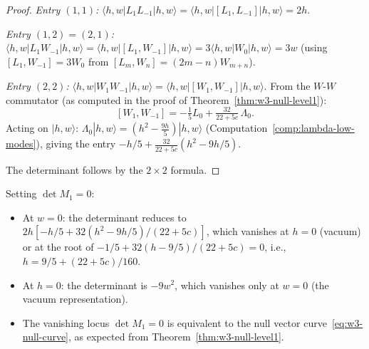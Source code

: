\begin{proof}
\emph{Entry $(1,1)$:}
$\langle h,w|L_1 L_{-1}|h,w\rangle = \langle h,w|[L_1,L_{-1}]|h,w\rangle
= 2h$.

\emph{Entry $(1,2) = (2,1)$:}
$\langle h,w|L_1 W_{-1}|h,w\rangle = \langle h,w|[L_1,W_{-1}]|h,w\rangle
= 3\langle h,w|W_0|h,w\rangle = 3w$
(using $[L_1, W_{-1}] = 3W_0$ from $[L_m, W_n] = (2m{-}n)W_{m+n}$).

\emph{Entry $(2,2)$:}
$\langle h,w|W_1 W_{-1}|h,w\rangle = \langle h,w|[W_1,W_{-1}]|h,w\rangle$.
From the $W$-$W$ commutator (as computed in the proof of
Theorem~\ref{thm:w3-null-level1}):
\[
[W_1, W_{-1}] = -\tfrac{1}{5}L_0 + \tfrac{32}{22+5c}\,\Lambda_0.
\]
Acting on $|h,w\rangle$: $\Lambda_0|h,w\rangle = (h^2 - \frac{9h}{5})|h,w\rangle$
(Computation~\ref{comp:lambda-low-modes}), giving the entry
$-h/5 + \frac{32}{22+5c}(h^2 - 9h/5)$.

The determinant follows by the $2\times 2$ formula.
\end{proof}

\begin{computation}\label{comp:kac-vanishing-level1}
Setting $\det M_1 = 0$:
\begin{itemize}
\item At $w = 0$: the determinant reduces to
  $2h[-h/5 + 32(h^2 - 9h/5)/(22+5c)]$, which vanishes at
  $h = 0$ (vacuum) or at the root of
  $-1/5 + 32(h - 9/5)/(22+5c) = 0$, i.e.,
  $h = 9/5 + (22+5c)/160$.
\item At $h = 0$: the determinant is $-9w^2$, which vanishes
  only at $w = 0$ (the vacuum representation).
\item The vanishing locus $\det M_1 = 0$ is equivalent to
  the null vector curve~\eqref{eq:w3-null-curve},
  as expected from Theorem~\ref{thm:w3-null-level1}.
\end{itemize}
\end{computation}

